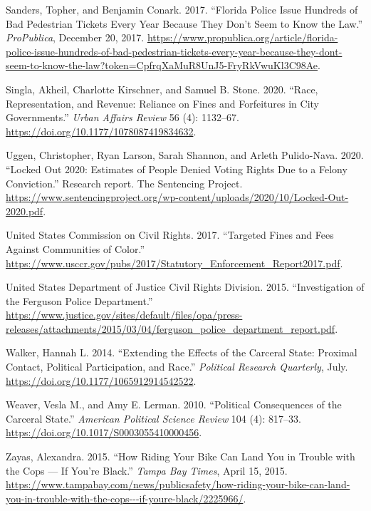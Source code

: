 \documentclass[
  12pt,
]{article}
\newlength{\cslhangindent}
\newenvironment{cslreferences}%
  {\setlength{\parindent}{0pt}%
  \everypar{\setlength{\hangindent}{\cslhangindent}}\ignorespaces}%
  {\par}
\begin{document}
\begin{cslreferences}
\leavevmode\hypertarget{ref-Sanders2017}{}%
Sanders, Topher, and Benjamin Conark. 2017. ``Florida Police Issue Hundreds of Bad Pedestrian Tickets Every Year Because They Don't Seem to Know the Law.'' \emph{ProPublica}, December 20, 2017. \url{https://www.propublica.org/article/florida-police-issue-hundreds-of-bad-pedestrian-tickets-every-year-because-they-dont-seem-to-know-the-law?token=CpfrqXaMuR8UnJ5-FryRkVwuKl3C98Ae}.

\leavevmode\hypertarget{ref-Singla2020}{}%
Singla, Akheil, Charlotte Kirschner, and Samuel B. Stone. 2020. ``Race, Representation, and Revenue: Reliance on Fines and Forfeitures in City Governments.'' \emph{Urban Affairs Review} 56 (4): 1132--67. \url{https://doi.org/10.1177/1078087419834632}.

\leavevmode\hypertarget{ref-Uggen2020}{}%
Uggen, Christopher, Ryan Larson, Sarah Shannon, and Arleth Pulido-Nava. 2020. ``Locked Out 2020: Estimates of People Denied Voting Rights Due to a Felony Conviction.'' Research report. The Sentencing Project. \url{https://www.sentencingproject.org/wp-content/uploads/2020/10/Locked-Out-2020.pdf}.

\leavevmode\hypertarget{ref-UnitedStatesCommissiononCivilRights2017}{}%
United States Commission on Civil Rights. 2017. ``Targeted Fines and Fees Against Communities of Color.'' \url{https://www.usccr.gov/pubs/2017/Statutory_Enforcement_Report2017.pdf}.

\leavevmode\hypertarget{ref-UnitedStatesDepartmentofJusticeCivilRightsDivision2015}{}%
United States Department of Justice Civil Rights Division. 2015. ``Investigation of the Ferguson Police Department.'' \url{https://www.justice.gov/sites/default/files/opa/press-releases/attachments/2015/03/04/ferguson_police_department_report.pdf}.

\leavevmode\hypertarget{ref-Walker2014}{}%
Walker, Hannah L. 2014. ``Extending the Effects of the Carceral State: Proximal Contact, Political Participation, and Race.'' \emph{Political Research Quarterly}, July. \url{https://doi.org/10.1177/1065912914542522}.

\leavevmode\hypertarget{ref-Weaver2010}{}%
Weaver, Vesla M., and Amy E. Lerman. 2010. ``Political Consequences of the Carceral State.'' \emph{American Political Science Review} 104 (4): 817--33. \url{https://doi.org/10.1017/S0003055410000456}.

\leavevmode\hypertarget{ref-Zayas2015}{}%
Zayas, Alexandra. 2015. ``How Riding Your Bike Can Land You in Trouble with the Cops --- If You're Black.'' \emph{Tampa Bay Times}, April 15, 2015. \url{https://www.tampabay.com/news/publicsafety/how-riding-your-bike-can-land-you-in-trouble-with-the-cops---if-youre-black/2225966/}.
\end{cslreferences}
\end{document}
